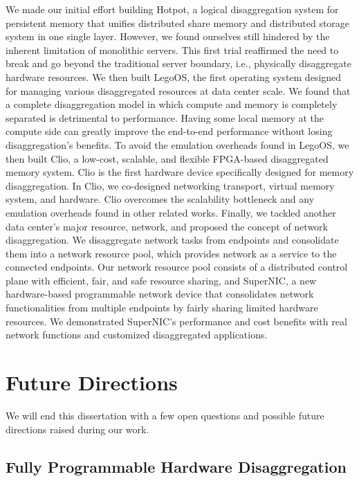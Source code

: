 We made our initial effort building Hotpot, a logical disaggregation system for persistent memory
that unifies distributed share memory and distributed storage system in one single layer.
However, we found ourselves still hindered by the inherent limitation of monolithic servers.
This first trial reaffirmed the need to break and go beyond the traditional server boundary,
i.e., physically disaggregate hardware resources.
We then built LegoOS, the first operating system designed for 
managing various disaggregated resources at data center scale.
We found that a complete disaggregation model in which compute and memory is completely separated
is detrimental to performance.
Having some local memory at the compute side can greatly improve the end-to-end performance without losing disaggregation's benefits.
To avoid the emulation overheads found in LegoOS,
we then built Clio, a low-cost, scalable, and flexible FPGA-based disaggregated memory system.
Clio is the first hardware device specifically designed for memory disaggregation.
In Clio, we co-designed networking transport, virtual memory system, and hardware.
Clio overcomes the scalability bottleneck and any emulation overheads found in other related works.
Finally, we tackled another data center's major resource, network, and proposed the concept of network disaggregation.
We disaggregate network tasks from endpoints and consolidate them into a network resource pool,
which provides network as a service to the connected endpoints.
Our network resource pool consists of a distributed control plane 
with efficient, fair, and safe resource sharing,
and SuperNIC, a new hardware-based programmable network device 
that consolidates network functionalities from multiple
endpoints by fairly sharing limited hardware resources.
We demonstrated SuperNIC's performance and cost benefits with
real network functions and customized disaggregated applications.

\section{Future Directions}

We will end this dissertation with a few open questions and possible
future directions raised during our work.

\subsection{Fully Programmable Hardware Disaggregation}

